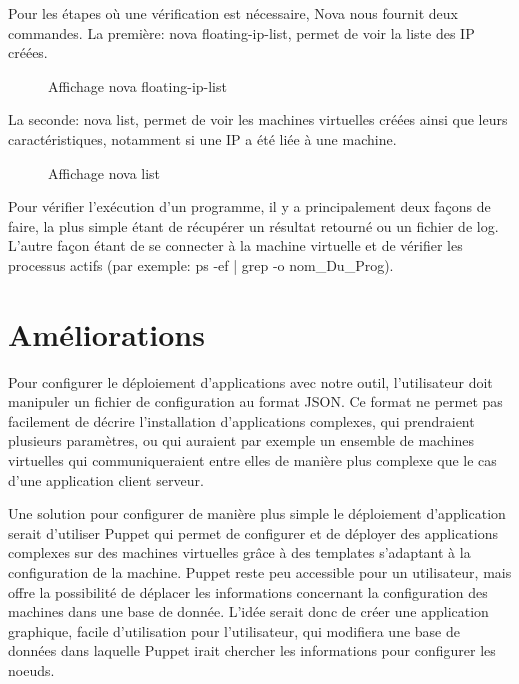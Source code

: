 \documentclass{report}
\begin{document}
Pour les étapes où une vérification est nécessaire, Nova nous fournit deux commandes. La première: nova floating-ip-list, permet de voir la liste des IP créées.
  
  \begin{figure}[H]
            \caption{Affichage nova floating-ip-list}
  \end{figure}

La seconde: nova list, permet de voir les machines virtuelles créées ainsi que leurs caractéristiques, notamment si une IP a été liée à une machine.\bigbreak
  
  \begin{figure}[H]
            \caption{Affichage nova list}
  \end{figure}


Pour vérifier l'exécution d'un programme, il y a principalement deux façons de faire, la plus simple étant de récupérer un résultat retourné ou un fichier de log. L'autre façon étant de se connecter à la machine virtuelle et de vérifier les processus actifs (par exemple: ps -ef | grep -o nom\_Du\_Prog).


    \section{Améliorations}

    Pour configurer le déploiement d'applications avec notre outil, l'utilisateur doit manipuler un fichier de configuration au format JSON. Ce format ne permet pas facilement de décrire l'installation d'applications complexes, qui prendraient plusieurs paramètres, ou qui auraient par exemple un ensemble de machines virtuelles qui communiqueraient entre elles de manière plus complexe que le cas d'une application client serveur.
    \bigbreak
    
    Une solution pour configurer de manière plus simple le déploiement d'application serait d'utiliser Puppet qui permet de configurer et de déployer des applications complexes sur des machines virtuelles  grâce à des templates s'adaptant à la configuration de la machine.\newline
    Puppet reste peu accessible pour un utilisateur, mais offre la possibilité de déplacer les informations concernant la configuration des machines dans une base de donnée.\newline
    L'idée serait donc de créer une application graphique, facile d'utilisation pour l'utilisateur, qui modifiera une base de données dans laquelle Puppet irait chercher les informations pour configurer les noeuds.
    \bigbreak
\end{document}
